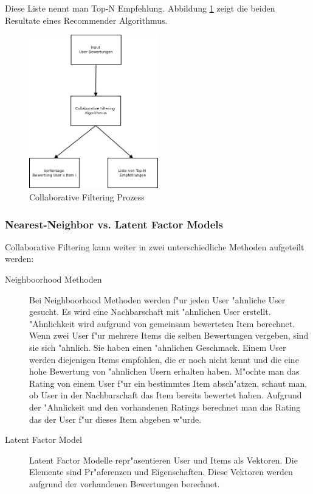 \documentclass[a4paper, 12pt]{article}
\begin{document}
Diese Liste nennt man Top-N Empfehlung. Abbildung \ref{fig:cfprocess} zeigt die beiden Resultate eines Recommender Algorithmus.

\begin{figure}
  \centering
      \includegraphics[width=0.5\textwidth]{cf}
  \caption{Collaborative Filtering Prozess}
  \label{fig:cfprocess}
\end{figure}

\subsubsection{Nearest-Neighbor vs. Latent Factor Models}
\label{sec:cfmodels}

Collaborative Filtering kann weiter in zwei unterschiedliche Methoden aufgeteilt werden:

\begin{description}
\item[Neighboorhood Methoden] Bei Neighboorhood Methoden werden f"ur jeden User "ahnliche User gesucht. Es wird eine Nachbarschaft mit "ahnlichen User erstellt.
"Ahnlichkeit wird aufgrund von gemeinsam bewerteten Item berechnet. Wenn zwei User f"ur mehrere Items die selben Bewertungen vergeben, sind sie sich "ahnlich. Sie haben einen "ahnlichen Geschmack. Einem User werden diejenigen Items empfohlen, die er noch nicht kennt und die eine hohe Bewertung von "ahnlichen Usern erhalten haben.
M"ochte man das Rating von einem User f"ur ein bestimmtes Item ab\-sch"atz\-en, schaut man, ob User in der Nachbarschaft das Item bereits bewertet haben. Aufgrund der "Ahnlickeit und den vorhandenen Ratings berechnet man das Rating das der User f"ur dieses Item abgeben w"urde.
\item[Latent Factor Model] Latent Factor Modelle repr"asentieren User und Items als Vektoren. Die Elemente sind Pr"aferenzen und Eigenschaften. Diese Vektoren werden aufgrund der vorhandenen Bewertungen berechnet.
\end{description}
\end{document}
